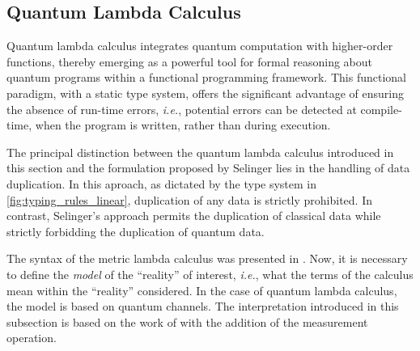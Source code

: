 



\subsection{Quantum Lambda Calculus}


Quantum lambda calculus integrates quantum computation with higher-order functions, thereby emerging as a powerful tool for formal reasoning about quantum programs within a functional programming framework. This functional paradigm, with a static type system, offers the significant advantage of ensuring the absence of run-time errors, \textit{i.e.}, potential errors can be detected at compile-time, when the program is written, rather than during execution.

The principal distinction between the quantum lambda calculus introduced in this section and the formulation proposed by Selinger \cite{selinger2006lambda,selinger2009quantum} lies in the handling of data duplication. In this aproach, as dictated by the type system in \autoref{fig:typing_rules_linear}, duplication of any data is strictly prohibited. In contrast, Selinger's approach permits the duplication of classical data while strictly forbidding the duplication of quantum data.

The syntax of the metric lambda calculus was presented in . Now, it is necessary to define the \emph{model} of the ``reality'' of interest, \textit{i.e.}, what the terms of the calculus mean within the ``reality'' considered. In the case of quantum lambda calculus, the model is based on quantum channels. The interpretation introduced in this subsection is based on the work of \cite{dahlqvist2022syntactic} with the addition of the measurement operation.


